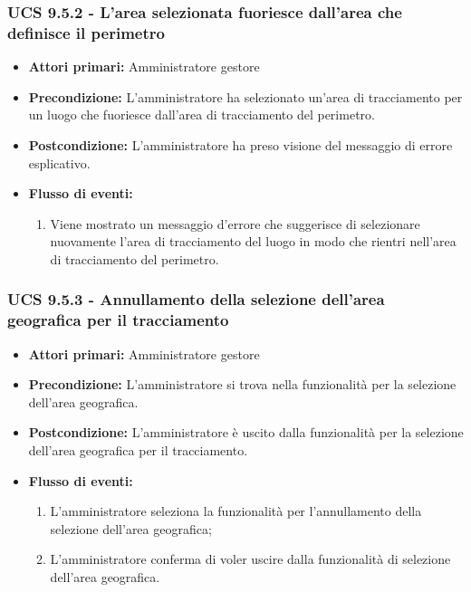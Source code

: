 \subsubsection{UCS 9.5.2 - L'area selezionata fuoriesce dall'area che definisce il perimetro}%
\begin{itemize}
\item \textbf{Attori primari:} Amministratore gestore
\item \textbf{Precondizione:} L'amministratore ha selezionato un'area di tracciamento per un luogo che fuoriesce dall'area di tracciamento del perimetro.
\item \textbf{Postcondizione:} L'amministratore ha preso visione del messaggio di errore esplicativo.
\item \textbf{Flusso di eventi:}
    \begin{enumerate}
    \item Viene mostrato un messaggio d'errore che suggerisce di selezionare nuovamente l'area di tracciamento del luogo in modo che rientri nell'area di tracciamento del perimetro.
    \end{enumerate} 
\end{itemize}

\subsubsection{UCS 9.5.3 - Annullamento della selezione dell'area geografica per il tracciamento}%
\begin{itemize}
\item \textbf{Attori primari:} Amministratore gestore
\item \textbf{Precondizione:} L'amministratore si trova nella funzionalità per la selezione dell'area geografica.
\item \textbf{Postcondizione:} L'amministratore è uscito dalla funzionalità per la selezione dell'area geografica per il tracciamento.
\item \textbf{Flusso di eventi:}
    \begin{enumerate}
    \item L'amministratore seleziona la funzionalità per l'annullamento della selezione dell'area geografica;
    \item L'amministratore conferma di voler uscire dalla funzionalità di selezione dell'area geografica.
    \end{enumerate} 
\end{itemize}

